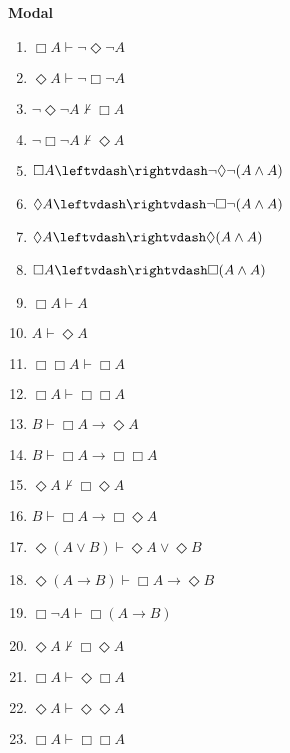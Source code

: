 
\noindent \textbf{Modal}

\begin{enumerate}
\setcounter{enumi}{\value{enumi_saved}}
\item $ \Box A\vdash  \neg \Diamond \neg A $\hfill\emph{ }  
\item $ \Diamond A\vdash  \neg \Box \neg A $\hfill\emph{ }  
\item $ \neg \Diamond \neg A\nvdash  \Box A $\hfill\emph{ }  
\item $ \neg \Box \neg A\nvdash  \Diamond A $\hfill\emph{ }  
\item $ \Box A\leftvdash\rightvdash  \neg \Diamond \neg (A \wedge  A) $ \hfill\emph{ }  
\item $ \Diamond A\leftvdash\rightvdash  \neg \Box \neg (A \wedge  A) $ \hfill\emph{ }  
\item $ \Diamond A\leftvdash\rightvdash  \Diamond (A \wedge  A) $ \hfill\emph{ }  
\item $ \Box A\leftvdash\rightvdash  \Box (A \wedge  A) $ \hfill\emph{ }  
\item $ \Box A\vdash  A $\hfill\emph{ }  
\item $ A\vdash  \Diamond A $\hfill\emph{ }  
\item $ \Box \Box A\vdash  \Box A $\hfill\emph{ }  
\item $ \Box A\vdash  \Box \Box A $\hfill\emph{ }  
\item $ B\vdash  \Box A \rightarrow  \Diamond A $\hfill\emph{ }  
\item $ B\vdash  \Box A \rightarrow  \Box \Box A $\hfill\emph{ }  
\item $ \Diamond A\nvdash  \Box \Diamond A $\hfill\emph{ }  
\item $ B\vdash  \Box A \rightarrow  \Box \Diamond A $\hfill\emph{ }  
\item $ \Diamond (A \vee  B)\vdash  \Diamond A \vee  \Diamond B $\hfill\emph{ }  
\item $ \Diamond (A \rightarrow  B)\vdash  \Box A \rightarrow  \Diamond B $\hfill\emph{ }  
\item $ \Box \neg A\vdash  \Box (A \rightarrow  B) $\hfill\emph{ }  
\item $ \Diamond A\nvdash  \Box \Diamond A $\hfill\emph{ }  
\item $ \Box A\vdash  \Diamond \Box A $\hfill\emph{ }  
\item $ \Diamond A\vdash  \Diamond \Diamond A $\hfill\emph{ }  
\item $ \Box A\vdash  \Box \Box A $\hfill\emph{ }  
\setcounter{enumi_saved}{\value{enumi}}
\end{enumerate}


